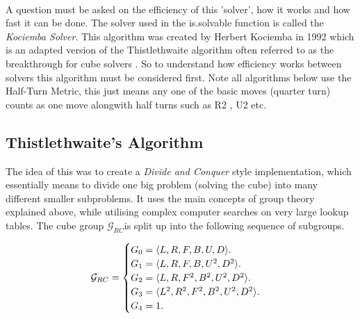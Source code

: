 \documentclass{article}
\DeclarePairedDelimiter{\opair}{\langle}{\rangle}
\begin{document}
\paragraph*{}

A question must be asked on the efficiency of this 'solver', how it works and how fast it can be done. 
The solver used in the is.solvable function is called the \textit{Kociemba Solver}. This algorithm was created by Herbert Kociemba in 1992 which is an adapted version of the Thistlethwaite algorithm often referred to as the breakthrough for cube solvers\cite{Thistlethwaite}
. So to understand how efficiency works between solvers this algorithm must be considered first. Note all algorithms below use the Half-Turn Metric, this just means any one of the basic moves (quarter turn) counts as one move alongwith  half turns such as R2 , U2 etc. 

\subsection{Thistlethwaite's Algorithm}

The idea of this was to create a \textit{Divide and Conquer} style implementation, which essentially means to divide one big problem (solving the cube) into many different smaller subproblems. It uses the main concepts of group theory explained above, while utilising complex computer searches on very large lookup tables. 
The cube group $\mathcal{G}_{RC}$is split up into the following sequence of subgroups.  

\begin{equation}
  \mathcal{G}_{RC}=\begin{cases}
    G_{0} = \text{$\opair{L,R,F,B,U,D}$}.\\
    G_{1} = \text{$\opair{L,R,F,B,U^{2},D^{2}}$}.\\
    G_{2} = \text{$\opair{L,R,F^{2},B^{2},U^{2},D^{2}}$}.\\
    G_{3} = \text{$\opair{L^{2},R^{2},F^{2},B^{2},U^{2},D^{2}}$}.\\
    G_{4} = \text{1}.
  \end{cases}
\end{equation}
\end{document}

